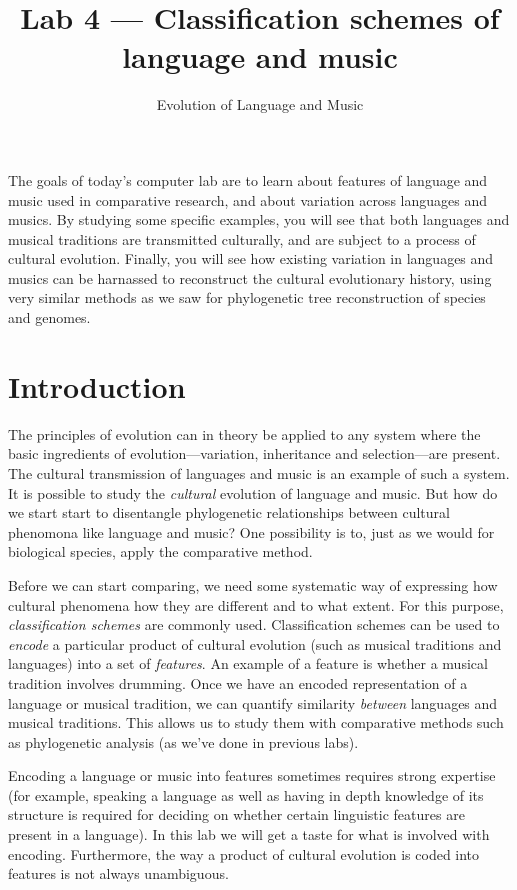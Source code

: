 \documentclass[a4paper, 9pt]{article}
\title{Lab 4 --- Classification schemes of language and music}
\author{Evolution of Language and Music}
\begin{document}
\maketitle

\begin{goals}
The goals of today's computer lab are to learn about features of
language and music used in comparative research, and about variation
across languages and musics. By studying some specific examples, you
will see that both languages and musical traditions are transmitted
culturally, and are subject to a process of cultural evolution. Finally,
you will see how existing variation in languages and musics can be
harnassed to reconstruct the cultural evolutionary history, using very
similar methods as we saw for phylogenetic tree reconstruction of
species and genomes.
\end{goals}

\section{Introduction}\label{introduction}

The principles of evolution can in theory be applied to any system where
the basic ingredients of evolution---variation, inheritance and
selection---are present. The cultural transmission of languages and
music is an example of such a system. It is possible to study the
\emph{cultural} evolution of language and music. But how do we start
start to disentangle phylogenetic relationships between cultural
phenomona like language and music? One possibility is to, just as we
would for biological species, apply the comparative method.

Before we can start comparing, we need some systematic way of expressing
how cultural phenomena how they are different and to what extent. For
this purpose, \emph{classification schemes} are commonly used.
Classification schemes can be used to \emph{encode} a particular product
of cultural evolution (such as musical traditions and languages) into a
set of \emph{features}. An example of a feature is whether a musical
tradition involves drumming. Once we have an encoded representation of a
language or musical tradition, we can quantify similarity \emph{between}
languages and musical traditions. This allows us to study them with
comparative methods such as phylogenetic analysis (as we've done in
previous labs).

Encoding a language or music into features sometimes requires strong
expertise (for example, speaking a language as well as having in depth
knowledge of its structure is required for deciding on whether certain
linguistic features are present in a language). In this lab we will get
a taste for what is involved with encoding. Furthermore, the way a
product of cultural evolution is coded into features is not always
unambiguous.
\end{document}
